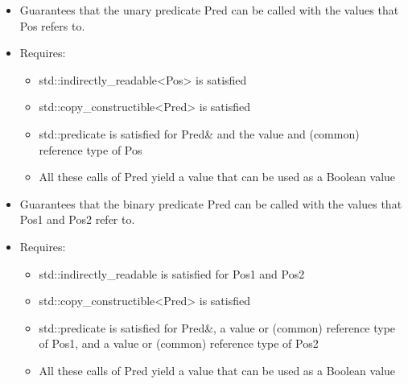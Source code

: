 
\begin{itemize}
\item
Guarantees that the unary predicate Pred can be called with the values that Pos refers to.

\item
Requires:
\begin{itemize}
\item
std::indirectly\_readable<Pos> is satisfied

\item
std::copy\_constructible<Pred> is satisfied

\item
std::predicate is satisfied for Pred\& and the value and (common) reference type of Pos

\item
All these calls of Pred yield a value that can be used as a Boolean value
\end{itemize}
\end{itemize}


\begin{itemize}
\item
Guarantees that the binary predicate Pred can be called with the values that Pos1 and Pos2 refer to.

\item
Requires:
\begin{itemize}
\item
std::indirectly\_readable is satisfied for Pos1 and Pos2

\item
std::copy\_constructible<Pred> is satisfied

\item
std::predicate is satisfied for Pred\&, a value or (common) reference type of Pos1, and a value or (common) reference type of Pos2

\item
All these calls of Pred yield a value that can be used as a Boolean value
\end{itemize}
\end{itemize}


